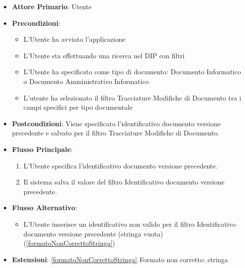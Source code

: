 \begin{itemize}
      \item \textbf{Attore Primario}: Utente
      \item \textbf{Precondizioni}: 
      \begin{itemize}            
            \item L'Utente ha avviato l'applicazione
            \item L'Utente sta effettuando una ricerca nel DIP con filtri
            \item L'Utente ha specificato come tipo di documento: Documento Informatico o Documento Amministrativo Informatico
            \item L'utente ha selezionato il filtro Tracciature Modifiche di Documento tra i campi specifici per tipo documentale
      \end{itemize}
      \item \textbf{Postcondizioni}: Viene specificato l'identificativo documento versione precedente e salvato per il filtro Tracciature Modifiche di Documento.
      \item \textbf{Flusso Principale}:
            \begin{enumerate}
                  \item L'Utente specifica l'identificativo documento versione precedente.
                  \item Il sistema salva il valore del filtro Identificativo documento versione precedente.
            \end{enumerate}
      \item \textbf{Flusso Alternativo}:
      \begin{itemize}
            \item L'Utente inserisce un identificativo non valido per il filtro Identificativo documento versione precedente (stringa vuota) (\ref{formatoNonCorrettoStringa})
      \end{itemize}
      \item \textbf{Estensioni}: \ref{formatoNonCorrettoStringa} Formato non corretto: stringa
\end{itemize}


